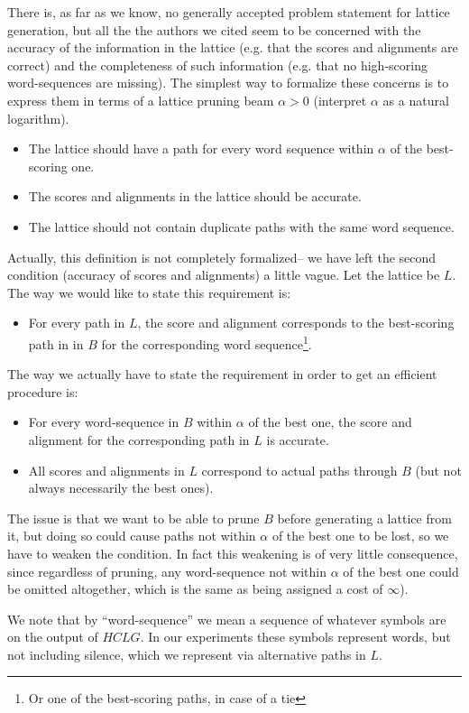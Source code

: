 \documentclass{article}
\def\HCLG{{\mathit{HCLG}}}
\begin{document}
There is, as far as we know, no generally accepted problem statement
for lattice generation, but all the the authors we cited seem to
be concerned with the accuracy of the information in the lattice (e.g. that the
scores and alignments are correct) and the completeness of such information (e.g.
that no high-scoring word-sequences are missing).  The simplest
way to formalize these concerns is to express them in terms of a lattice 
pruning beam $\alpha > 0$ (interpret $\alpha$ as a natural logarithm).
\begin{itemize}
  \item The lattice should have a path for every word sequence within $\alpha$ of the best-scoring one.
  \item The scores and alignments in the lattice should be accurate.
  \item The lattice should not contain duplicate paths with the same word sequence.
\end{itemize}
Actually, this definition is not completely formalized-- we have left
the second condition (accuracy of scores and alignments) a little vague.
Let the lattice be $L$.  The way we would like to state this requirement is:
\begin{itemize}
  \item For every path in $L$, the score and alignment corresponds to 
   the best-scoring path in in $B$ for the corresponding word
   sequence\footnote{Or one of the best-scoring paths, in case of a tie}.
\end{itemize}
The way we actually have to state the requirement in order to get an efficient procedure is:
\begin{itemize}
  \item For every word-sequence in $B$ within $\alpha$ of the best one, the score and alignment
    for the corresponding path in $L$ is accurate.
  \item All scores and alignments in $L$ correspond to actual paths through $B$ (but not always
   necessarily the best ones).
\end{itemize}
The issue is that we want to be able to prune $B$ before generating a lattice from it,
but doing so could cause paths not within $\alpha$ of the best one to be lost, so we have
to weaken the condition.  In fact this weakening is of very little consequence, since regardless
of pruning, any word-sequence not within $\alpha$ of the best one could be omitted altogether, 
which is the same as being assigned a cost of $\infty$).

We note that by ``word-sequence'' we mean a sequence of whatever symbols are on the
output of $\HCLG$.  In our experiments these symbols represent words, but not including
silence, which we represent via alternative paths in $L$.
\end{document}
